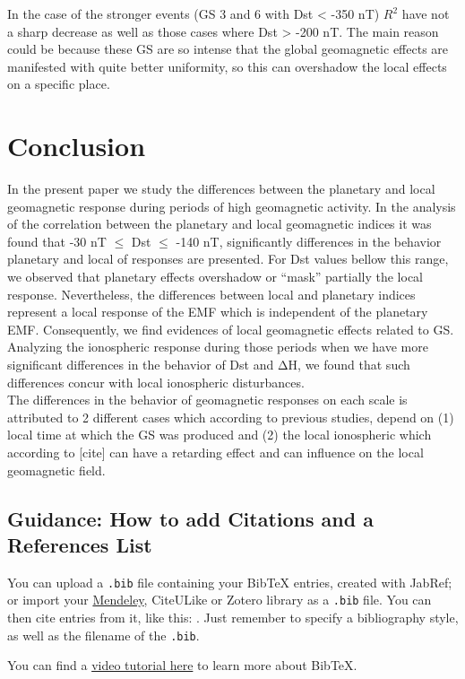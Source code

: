 \documentclass[a4paper, 11pt]{article}
\begin{document}
In the case of the stronger events (GS 3 and 6 with Dst < -350 nT) $R^2$ have not a sharp decrease as well as those cases where Dst > -200 nT. The main reason could be because these GS are so intense that the global geomagnetic effects are manifested with quite better uniformity, so this can overshadow the local effects on a specific place. 

\section{Conclusion}
In the present paper we study the differences between the planetary and local geomagnetic response during periods of high geomagnetic activity. In the analysis of the correlation between the planetary and local geomagnetic indices it was found that -30 nT $\leq$ Dst $\leq$ -140 nT, significantly differences in the behavior planetary and local of responses are presented. For Dst values bellow this range, we observed that planetary effects overshadow or ``mask'' partially the local response. Nevertheless, the differences between local and planetary indices represent a local response of the EMF which is independent of the planetary EMF. Consequently, we find evidences of local geomagnetic effects related to GS. \\ 

Analyzing the ionospheric response during those periods when we have more significant differences in the behavior of Dst and $\mathrm{\Delta H}$, we found that such differences concur with local ionospheric disturbances.  \\ 

The differences in the behavior of geomagnetic responses on each scale is attributed to 2 different cases which according to previous studies, depend on (1) local time at which the GS was produced and (2) the local ionospheric which according to [cite] can have a retarding effect and can influence on the local geomagnetic field. \\ 


\subsection*{Guidance: How to add Citations and a References List}

You can upload a \verb|.bib| file containing your BibTeX entries, created with JabRef; or import your \href{https://www.overleaf.com/blog/184}{Mendeley}, CiteULike or Zotero library as a \verb|.bib| file. You can then cite entries from it, like this: \cite{greenwade93}. Just remember to specify a bibliography style, as well as the filename of the \verb|.bib|.

You can find a \href{https://www.overleaf.com/help/97-how-to-include-a-bibliography-using-bibtex}{video tutorial here} to learn more about BibTeX.





\end{document}
